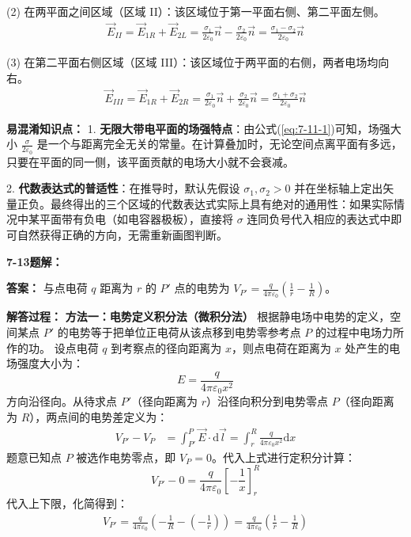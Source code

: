 (2) 在两平面之间区域（区域 II）：该区域位于第一平面右侧、第二平面左侧。
\begin{align*}
	\vec{E}_{II} = \vec{E}_{1R} + \vec{E}_{2L} = \frac{\sigma_1}{2\varepsilon_0}\vec{n} - \frac{\sigma_2}{2\varepsilon_0}\vec{n} = \frac{\sigma_1 - \sigma_2}{2\varepsilon_0}\vec{n}
\end{align*}

(3) 在第二平面右侧区域（区域 III）：该区域位于两平面的右侧，两者电场均向右。
\begin{align*}
	\vec{E}_{III} = \vec{E}_{1R} + \vec{E}_{2R} = \frac{\sigma_1}{2\varepsilon_0}\vec{n} + \frac{\sigma_2}{2\varepsilon_0}\vec{n} = \frac{\sigma_1 + \sigma_2}{2\varepsilon_0}\vec{n}
\end{align*}

\textbf{易混淆知识点： }
1. \textbf{无限大带电平面的场强特点}：由公式(\ref{eq:7-11-1})可知，场强大小 $\frac{\sigma}{2\varepsilon_0}$ 是一个与距离完全无关的常量。在计算叠加时，无论空间点离平面有多远，只要在平面的同一侧，该平面贡献的电场大小就不会衰减。

2. \textbf{代数表达式的普适性}：在推导时，默认先假设 $\sigma_1, \sigma_2 > 0$ 并在坐标轴上定出矢量正负。最终得出的三个区域的代数表达式实际上具有绝对的通用性：如果实际情况中某平面带有负电（如电容器极板），直接将 $\sigma$ 连同负号代入相应的表达式中即可自然获得正确的方向，无需重新画图判断。

\vspace{2em}

\textbf{7-13题解： }
\setcounter{equation}{0}
\renewcommand{\theHequation}{7-13.\arabic{equation}}

\textbf{答案： }
与点电荷 $q$ 距离为 $r$ 的 $P'$ 点的电势为 $V_{P'} = \frac{q}{4\pi\varepsilon_0} \left( \frac{1}{r} - \frac{1}{R} \right)$。

\textbf{解答过程： }
\textbf{方法一：电势定义积分法（微积分法）}
根据静电场中电势的定义，空间某点 $P'$ 的电势等于把单位正电荷从该点移到电势零参考点 $P$ 的过程中电场力所作的功。
设点电荷 $q$ 到考察点的径向距离为 $x$，则点电荷在距离为 $x$ 处产生的电场强度大小为：
\begin{equation}\label{eq:7-13-1}
	E = \frac{q}{4\pi\varepsilon_0 x^2}
\end{equation}
方向沿径向。从待求点 $P'$（径向距离为 $r$）沿径向积分到电势零点 $P$（径向距离为 $R$），两点间的电势差定义为：
\begin{align*}
	V_{P'} - V_P &= \int_{P'}^{P} \vec{E} \cdot \mathrm{d}\vec{l} = \int_{r}^{R} \frac{q}{4\pi\varepsilon_0 x^2} \mathrm{d}x
\end{align*}
题意已知点 $P$ 被选作电势零点，即 $V_P = 0$。代入上式进行定积分计算：
\begin{equation}\label{eq:7-13-2}
	V_{P'} - 0 = \frac{q}{4\pi\varepsilon_0} \left[ -\frac{1}{x} \right]_{r}^{R}
\end{equation}
代入上下限，化简得到：
\begin{align*}
	V_{P'} = \frac{q}{4\pi\varepsilon_0} \left( -\frac{1}{R} - \left(-\frac{1}{r}\right) \right) = \frac{q}{4\pi\varepsilon_0} \left( \frac{1}{r} - \frac{1}{R} \right)
\end{align*}

